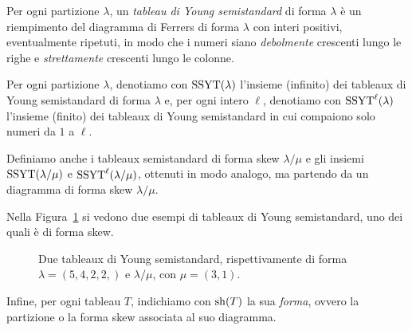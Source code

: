 \begin{definition}
    Per ogni partizione $\lambda$, un \emph{tableau di Young semistandard}
    di forma $\lambda$
    \`e un riempimento del diagramma di Ferrers di forma $\lambda$ con interi positivi,
    eventualmente ripetuti, in modo che i numeri siano \emph{debolmente}
    crescenti lungo le righe e \emph{strettamente} crescenti lungo le colonne.

    Per ogni partizione $\lambda$, denotiamo con $\operatorname{SSYT}(\lambda)$ l'insieme
    (infinito) dei tableaux di Young semistandard di forma $\lambda$ e,
    per ogni intero $\ell$,
    denotiamo con $\operatorname{SSYT}^\ell(\lambda)$ l'insieme (finito) dei tableaux di Young semistandard
    in cui compaiono solo numeri da $1$ a $\ell$.

    Definiamo anche i tableaux semistandard di forma skew $\lambda/\mu$
    e gli insiemi $\operatorname{SSYT}(\lambda/\mu)$ e $\operatorname{SSYT}^\ell(\lambda/\mu)$,
    ottenuti in modo analogo, ma partendo da un diagramma di forma skew $\lambda/\mu$.
\end{definition}


\begin{example}
    Nella Figura~\ref{fig:ex_ssyt} si vedono due esempi di tableaux di Young semistandard,
    uno dei quali \`e di forma skew.

    \begin{figure}[htbp]
        \centering
        \qquad
        \caption{Due tableaux di Young semistandard, rispettivamente di forma
        $\lambda = (5, 4, 2, 2, )$ e $\lambda/\mu$, con $\mu = (3,1)$.}
        \label{fig:ex_ssyt}
    \end{figure}
\end{example}

Infine, per ogni tableau $T$, indichiamo con $\operatorname{sh}(T)$ la sua \emph{forma},
ovvero la partizione o la forma skew associata al suo diagramma.
